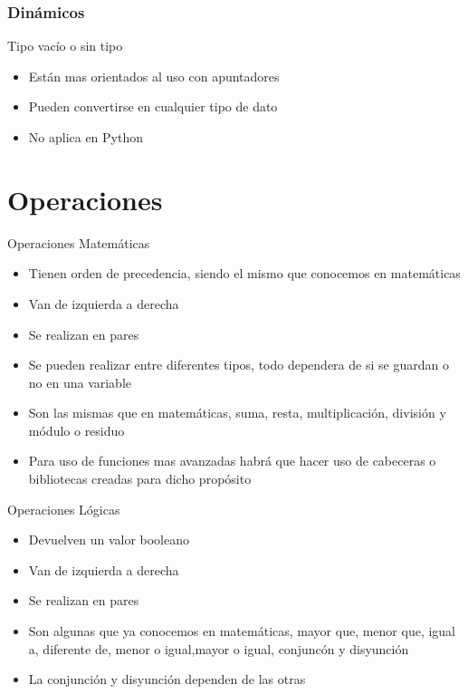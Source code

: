 \documentclass{beamer}
\begin{document}
\subsubsection{Din\'amicos}
\begin{frame}{Tipo vac\'io o sin tipo}
	\begin{itemize}
		\item Est\'an mas orientados al uso con apuntadores
		\item Pueden convertirse en cualquier tipo de dato
		\item No aplica en Python
	\end{itemize}
\end{frame}

\section{Operaciones}

\begin{frame}{Operaciones Matem\'aticas}
    \begin{itemize}
        \item Tienen orden de precedencia, siendo el mismo que conocemos en matem\'aticas
        \item Van de izquierda a derecha
        \item Se realizan en pares
        \item Se pueden realizar entre diferentes tipos, todo dependera de si se guardan o no en una variable
        \item Son las mismas que en matem\'aticas, suma, resta, multiplicaci\'on, divisi\'on y m\'odulo o residuo
        \item Para uso de funciones mas avanzadas habrá que hacer uso de cabeceras o bibliotecas creadas para dicho prop\'osito
    \end{itemize}
\end{frame}

\begin{frame}{Operaciones L\'ogicas}
    \begin{itemize}
        \item Devuelven un valor booleano
        \item Van de izquierda a derecha
        \item Se realizan en pares
        \item Son algunas que ya conocemos en matem\'aticas, mayor que, menor que, igual a, diferente de, menor o igual,mayor o igual, conjunc\'on y disyunci\'on
        \item La conjunci\'on y disyunci\'on dependen de las otras
    \end{itemize}
\end{frame}
\end{document}
